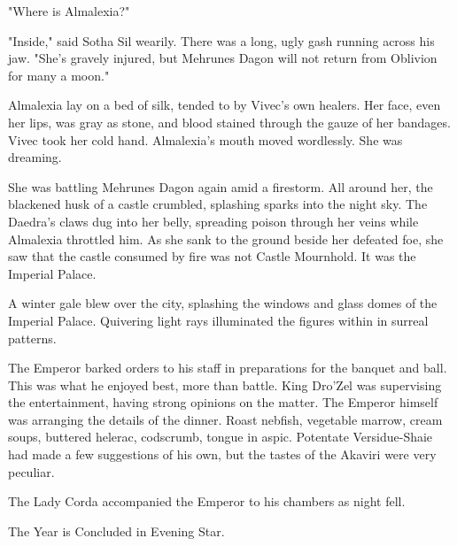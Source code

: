 "Where is Almalexia?"

"Inside," said Sotha Sil wearily. There was a long, ugly gash running across his jaw. "She's gravely injured, but Mehrunes Dagon will not return from Oblivion for many a moon."

Almalexia lay on a bed of silk, tended to by Vivec's own healers. Her face, even her lips, was gray as stone, and blood stained through the gauze of her bandages. Vivec took her cold hand. Almalexia's mouth moved wordlessly. She was dreaming.

She was battling Mehrunes Dagon again amid a firestorm. All around her, the blackened husk of a castle crumbled, splashing sparks into the night sky. The Daedra's claws dug into her belly, spreading poison through her veins while Almalexia throttled him. As she sank to the ground beside her defeated foe, she saw that the castle consumed by fire was not Castle Mournhold. It was the Imperial Palace.

A winter gale blew over the city, splashing the windows and glass domes of the Imperial Palace. Quivering light rays illuminated the figures within in surreal patterns.

The Emperor barked orders to his staff in preparations for the banquet and ball. This was what he enjoyed best, more than battle. King Dro'Zel was supervising the entertainment, having strong opinions on the matter. The Emperor himself was arranging the details of the dinner. Roast nebfish, vegetable marrow, cream soups, buttered helerac, codscrumb, tongue in aspic. Potentate Versidue-Shaie had made a few suggestions of his own, but the tastes of the Akaviri were very peculiar.

The Lady Corda accompanied the Emperor to his chambers as night fell.

The Year is Concluded in Evening Star.